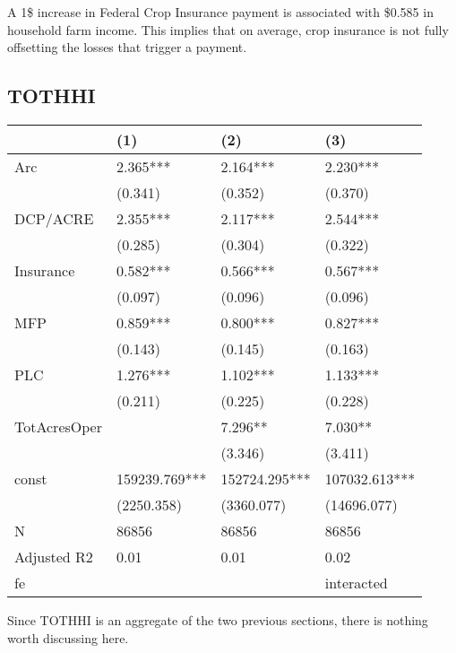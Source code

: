 \documentclass[11pt]{article}
\begin{document}
A 1\$ increase in Federal Crop Insurance payment is associated with \$0.585 in household farm income. This implies that on average, crop insurance is not fully offsetting the losses that trigger a payment.


\subsection{TOTHHI}
\label{sec:org42260d5}
\begin{center}
\begin{tabular}{llll}
\hline
 & (1) & (2) & (3)\\[0pt]
\hline
Arc & 2.365*** & 2.164*** & 2.230***\\[0pt]
 & (0.341) & (0.352) & (0.370)\\[0pt]
DCP/ACRE & 2.355*** & 2.117*** & 2.544***\\[0pt]
 & (0.285) & (0.304) & (0.322)\\[0pt]
Insurance & 0.582*** & 0.566*** & 0.567***\\[0pt]
 & (0.097) & (0.096) & (0.096)\\[0pt]
MFP & 0.859*** & 0.800*** & 0.827***\\[0pt]
 & (0.143) & (0.145) & (0.163)\\[0pt]
PLC & 1.276*** & 1.102*** & 1.133***\\[0pt]
 & (0.211) & (0.225) & (0.228)\\[0pt]
TotAcresOper &  & 7.296** & 7.030**\\[0pt]
 &  & (3.346) & (3.411)\\[0pt]
const & 159239.769*** & 152724.295*** & 107032.613***\\[0pt]
 & (2250.358) & (3360.077) & (14696.077)\\[0pt]
N & 86856 & 86856 & 86856\\[0pt]
Adjusted R2 & 0.01 & 0.01 & 0.02\\[0pt]
fe &  &  & interacted\\[0pt]
\end{tabular}
\end{center}

Since TOTHHI is an aggregate of the two previous sections, there is nothing worth discussing here.
\end{document}
